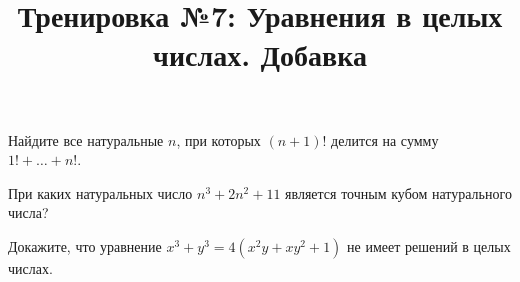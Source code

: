 



\title{Тренировка №7: Уравнения в целых числах. Добавка}
\maketitle

\begin{problem}[Факториалы]
	Найдите все натуральные $n$, при которых $(n + 1)!$ делится на сумму $1! + \ldots + n!$.
\end{problem}

\begin{problem}
	При каких натуральных число $n^3 + 2n^2 + 11$ является точным кубом натурального числа?
\end{problem}

\begin{problem}
	Докажите, что уравнение $x^3 + y^3 = 4(x^2 y + x y^2 + 1)$ не имеет решений в целых числах.
\end{problem}

